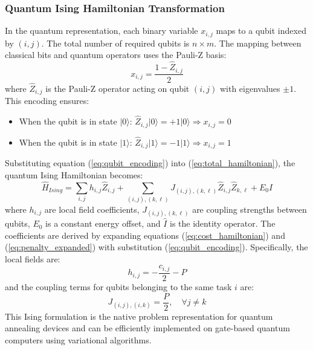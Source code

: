 \documentclass[lettersize,journal]{IEEEtran}
\begin{document}
\subsubsection{Quantum Ising Hamiltonian Transformation}

In the quantum representation, each binary variable $x_{i,j}$ maps to a qubit indexed by $(i,j)$. The total number of required qubits is $n \times m$. The mapping between classical bits and quantum operators uses the Pauli-Z basis:
\begin{equation}
x_{i,j} = \frac{1 - \hat{Z}_{i,j}}{2}
\label{eq:qubit_encoding}
\end{equation}
where $\hat{Z}_{i,j}$ is the Pauli-Z operator acting on qubit $(i,j)$ with eigenvalues $\pm 1$. This encoding ensures:
\begin{itemize}[leftmargin=*]
    \item When the qubit is in state $|0\rangle$: $\hat{Z}_{i,j}|0\rangle = +1|0\rangle \Rightarrow x_{i,j} = 0$
    \item When the qubit is in state $|1\rangle$: $\hat{Z}_{i,j}|1\rangle = -1|1\rangle \Rightarrow x_{i,j} = 1$
\end{itemize}
Substituting equation (\ref{eq:qubit_encoding}) into (\ref{eq:total_hamiltonian}), the quantum Ising Hamiltonian becomes:
\begin{equation}
\hat{H}_{Ising} = \sum_{i,j} h_{i,j} \hat{Z}_{i,j} + \sum_{(i,j),(k,\ell)} J_{(i,j),(k,\ell)} \hat{Z}_{i,j} \hat{Z}_{k,\ell} + E_0 \hat{I}
\label{eq:ising_hamiltonian}
\end{equation}
where $h_{i,j}$ are local field coefficients, $J_{(i,j),(k,\ell)}$ are coupling strengths between qubits, $E_0$ is a constant energy offset, and $\hat{I}$ is the identity operator. The coefficients are derived by expanding equations (\ref{eq:cost_hamiltonian}) and (\ref{eq:penalty_expanded}) with substitution (\ref{eq:qubit_encoding}).
Specifically, the local fields are:
\begin{equation}
h_{i,j} = -\frac{c_{i,j}}{2} - P
\label{eq:local_field}
\end{equation}
and the coupling terms for qubits belonging to the same task $i$ are:
\begin{equation}
J_{(i,j),(i,k)} = \frac{P}{2}, \quad \forall j \neq k
\label{eq:coupling}
\end{equation}
This Ising formulation is the native problem representation for quantum annealing devices and can be efficiently implemented on gate-based quantum computers using variational algorithms.
\end{document}
